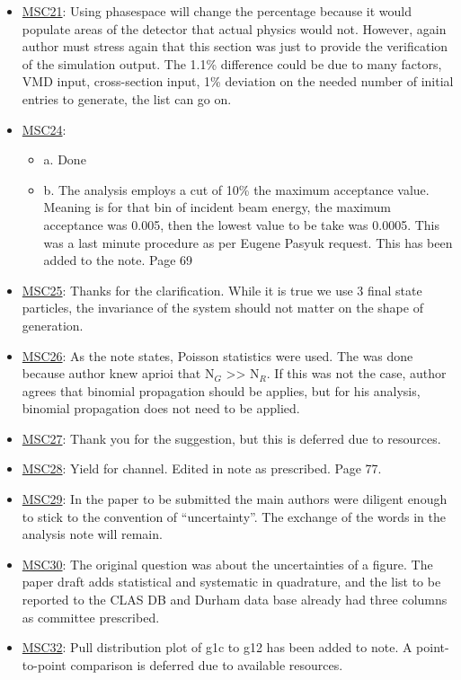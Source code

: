 \documentclass[11pt,a4paper]{article}
\begin{document}
\begin{itemize}
\begin{itemize}
    \end{itemize}
    \item \underline{MSC21}: Using phasespace will change the percentage because it would populate areas of the detector that actual physics would not. However, again author must stress again that this section was just to provide the verification of the simulation output. The 1.1\% difference could be due to many factors, VMD input, cross-section input, 1\% deviation on the needed number of initial entries to generate, the list can go on.
    \item \underline{MSC24}: 
    \begin{itemize}
    	\item a. Done
    	\item b. The analysis employs a cut of 10\% the maximum acceptance value. Meaning is for that bin of incident beam energy, the maximum acceptance was 0.005, then the lowest value to be take was 0.0005. This was a last minute procedure as per Eugene Pasyuk request. This has been added to the note. Page 69
    \end{itemize}
    \item \underline{MSC25}: Thanks for the clarification. While it is true we use 3 final state particles, the invariance of the system should not matter on the shape of generation.
    \item \underline{MSC26}: As the note states, Poisson statistics were used. The was done because author knew aprioi that N$_G$ >> N$_R$. If this was not the case, author agrees that binomial propagation should be applies, but for his analysis, binomial propagation does not need to be applied.
    \item \underline{MSC27}: Thank you for the suggestion, but this is deferred due to resources.
    \item \underline{MSC28}: Yield for channel. Edited in note as prescribed. Page 77.
    \item \underline{MSC29}: In the paper to be submitted the main authors were diligent enough to stick  to the convention of ``uncertainty''. The exchange of the words in the analysis note will remain.
    \item \underline{MSC30}: The original question was about the uncertainties of a figure. The paper draft adds statistical and systematic in quadrature, and the list to be reported to the CLAS DB and Durham data base already had three columns as committee prescribed.
    \item \underline{MSC32}: Pull distribution plot of g1c to g12 has been added to note. A point-to-point comparison is deferred due to available resources.
\end{itemize}
\end{document}
